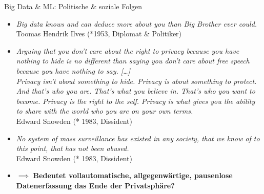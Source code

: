 \documentclass[
  10pt,
  ignorenonframetext,
]{beamer}
\providecommand{\tightlist}{%
  \setlength{\itemsep}{0pt}\setlength{\parskip}{0pt}}
\begin{document}
\begin{frame}{Big Data \& ML: Politische \& soziale Folgen}
\label{big-data-ml-politische-soziale-folgen}
\begin{itemize}[<+->]
\tightlist
\item
  \emph{Big data knows and can deduce more about you than Big Brother
  ever could.}\\
  Toomas Hendrik Ilves (*1953, Diplomat \& Politiker)
\end{itemize}

\begin{itemize}[<+->]
\tightlist
\item
  \emph{Arguing that you don't care about the right to privacy because
  you have nothing to hide is no different than saying you don't care
  about free speech because you have nothing to say. {[}\ldots{]}}\\
  \emph{Privacy isn't about something to hide. Privacy is about
  something to protect. And that's who you are. That's what you believe
  in. That's who you want to become. Privacy is the right to the self.
  Privacy is what gives you the ability to share with the world who you
  are on your own terms.}\\
  Edward Snowden (* 1983, Dissident)
\end{itemize}

\begin{itemize}[<+->]
\tightlist
\item
  \emph{No system of mass surveillance has existed in any society, that
  we know of to this point, that has not been abused.}\\
  Edward Snowden (* 1983, Dissident)
\end{itemize}

\begin{itemize}[<+->]
\tightlist
\item
  \(\implies\) \textbf{Bedeutet vollautomatische, allgegenwärtige,
  pausenlose Datenerfassung das Ende der Privatsphäre?}
\end{itemize}
\end{frame}
\end{document}
